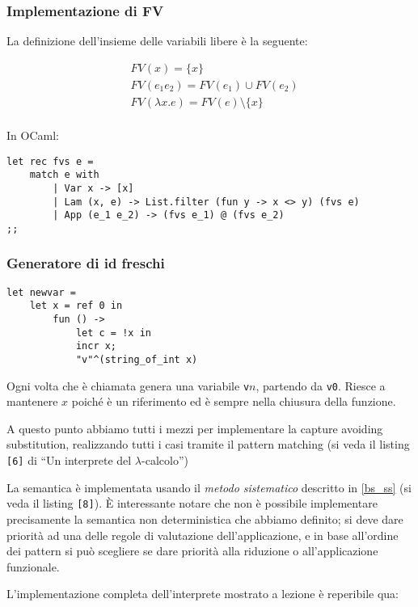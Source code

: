 \documentclass[a4paper,10pt]{article}
\begin{document}
 \subsubsection{Implementazione di FV}
 La definizione dell'insieme delle variabili libere è la seguente:
 
\[\begin{aligned}
   &FV(x) = \{x\}\\
&FV(e_1 e_2) = FV(e_1) \cup FV(e_2)\\
&FV(\lambda x.e) = FV(e) \setminus \{x\}\\
  \end{aligned}
\]

In OCaml:

\begin{lstlisting}
let rec fvs e = 
    match e with
        | Var x -> [x]
        | Lam (x, e) -> List.filter (fun y -> x <> y) (fvs e)
        | App (e_1 e_2) -> (fvs e_1) @ (fvs e_2)
;;\end{lstlisting}
\subsubsection{Generatore di id freschi}
\begin{lstlisting}
let newvar = 
    let x = ref 0 in
        fun () ->
            let c = !x in 
            incr x;
            "v"^(string_of_int x)
\end{lstlisting}

Ogni volta che è chiamata genera una variabile \texttt{v$n$}, partendo da \texttt{v0}. Riesce a mantenere $x$ poiché è un riferimento ed è sempre nella chiusura della funzione.\smallskip

A questo punto abbiamo tutti i mezzi per implementare la capture avoiding substitution, realizzando tutti i casi tramite il pattern matching (si veda il listing \texttt{[6]} di ``Un interprete del $\lambda$-calcolo'')\medskip

La semantica è implementata usando il \emph{metodo sistematico} descritto in \ref{bs_ss} (si veda il listing \texttt{[8]}). È interessante notare che non è possibile implementare precisamente la semantica non deterministica che abbiamo definito; si deve dare priorità ad una delle regole di valutazione dell'applicazione, e in base all'ordine dei pattern si può scegliere se dare priorità alla riduzione o all'applicazione funzionale.\bigskip

L'implementazione completa dell'interprete mostrato a lezione è reperibile qua:
\end{document}
